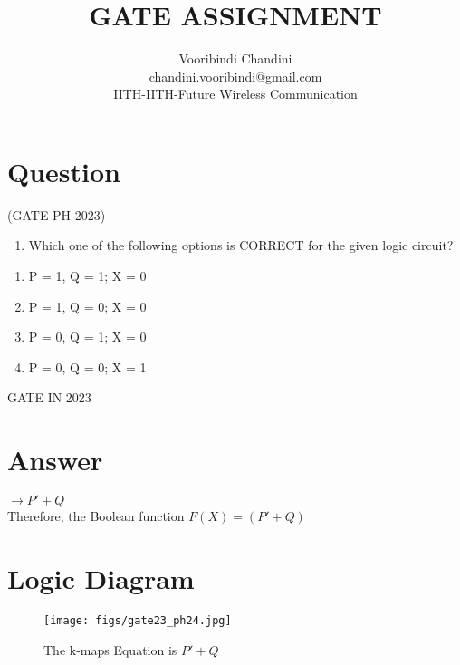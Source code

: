 
\def\mytitle{GATE ASSIGNMENT }
\def\myauthor{Vooribindi Chandini}
\def\mycontact{chandini.vooribindi@gmail.com}
\def\mymodule{IITH-Future Wireless Communication}

\usepackage{graphicx} 
\usepackage{enumitem}
\usepackage{tikz}
\usepackage{circuitikz}
\usepackage{karnaugh-map}
\usepackage{tabularx}
\title{\mytitle}
\author{\myauthor\\\mycontact\\IITH\hspace{0.3em}-\hspace{0.3em}\mymodule}

\maketitle
\tableofcontents

\section{\textbf{Question}}
\hfill(GATE PH 2023)
\begin{enumerate}
    \item  Which one of the following options is CORRECT for the given logic circuit?
\end{enumerate}
\vspace{1.0mm}
\begin{enumerate}[label=(\alph*)]
    \item P = 1, Q = 1; X = 0
    \item P = 1, Q = 0; X = 0
    \item P = 0, Q = 1; X = 0
    \item P = 0, Q = 0; X = 1
\end{enumerate}
\hfill{GATE IN 2023}
    \section{\textbf{Answer}}
    $\rightarrow P'+ Q$\\
    Therefore, the Boolean function $F(X)=(P' + Q)$
   \section{\textbf{Logic Diagram}}
 \begin{figure}[H]
        \centering
        \texttt{[image: figs/gate23\_ph24.jpg]}
        \caption{The k-maps Equation is $P'+Q$}
        \label{gate23_ph24.jpg}
    \end{figure}  
    
